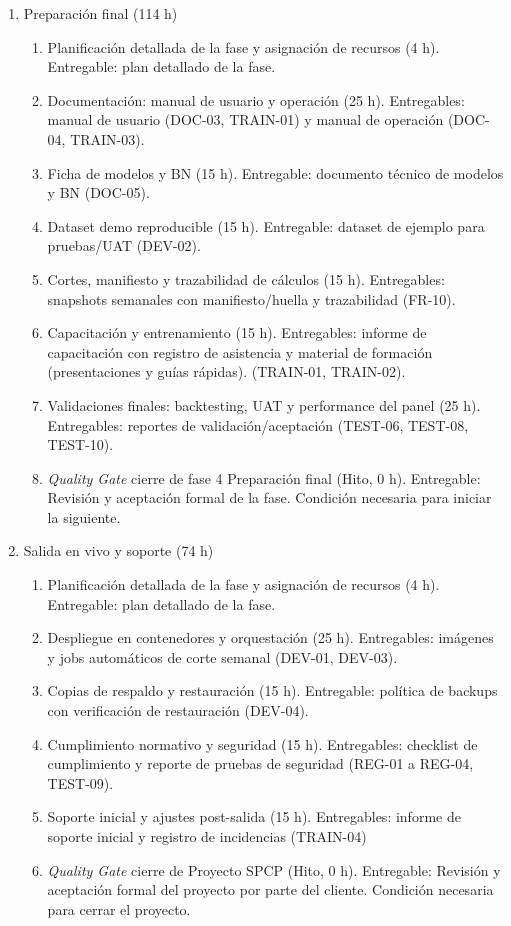 \documentclass[12pt]
{charter}
\begin{document}
\begin{enumerate}
  \item Preparación final (114 h)
    \begin{enumerate}[label*=\arabic*., ref=\theenumi.\arabic*]
      \item Planificación detallada de la fase y asignación de recursos (4 h). Entregable: plan detallado de la fase.
      \item Documentación: manual de usuario y operación (25 h). Entregables: manual de usuario (DOC-03, TRAIN-01) y manual de operación (DOC-04, TRAIN-03).
      \item Ficha de modelos y BN (15 h). Entregable: documento técnico de modelos y BN (DOC-05).
      \item Dataset demo reproducible (15 h). Entregable: dataset de ejemplo para pruebas/UAT (DEV-02).
      \item Cortes, manifiesto y trazabilidad de cálculos (15 h). Entregables: snapshots semanales con manifiesto/huella y trazabilidad (FR-10).
      \item Capacitación y entrenamiento (15 h). Entregables: informe de capacitación con registro de asistencia y material de formación (presentaciones y guías rápidas). (TRAIN-01, TRAIN-02).
      \item Validaciones finales: backtesting, UAT y performance del panel (25 h). Entregables: reportes de validación/aceptación (TEST-06, TEST-08, TEST-10).
      \item \textit{Quality Gate} cierre de fase 4 Preparación final (Hito, 0 h). Entregable: Revisión y aceptación formal de la fase. Condición necesaria para iniciar la siguiente.
    \end{enumerate}

  \item Salida en vivo y soporte (74 h)
    \begin{enumerate}[label*=\arabic*., ref=\theenumi.\arabic*]
      \item Planificación detallada de la fase y asignación de recursos (4 h). Entregable: plan detallado de la fase.
      \item Despliegue en contenedores y orquestación (25 h). Entregables: imágenes y jobs automáticos de corte semanal (DEV-01, DEV-03).
      \item Copias de respaldo y restauración (15 h). Entregable: política de backups con verificación de restauración (DEV-04).
      \item Cumplimiento normativo y seguridad (15 h). Entregables: checklist de cumplimiento y reporte de pruebas de seguridad (REG-01 a REG-04, TEST-09).
      \item Soporte inicial y ajustes post-salida (15 h). Entregables: informe de soporte inicial y registro de incidencias (TRAIN-04)
      \item \textit{Quality Gate} cierre de Proyecto SPCP (Hito, 0 h). Entregable: Revisión y aceptación formal del proyecto por parte del cliente. Condición necesaria para cerrar el proyecto.
    \end{enumerate}
\end{enumerate}
\end{document}
